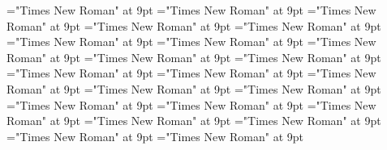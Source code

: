 \documentclass[gps1,twoside]{article}
\begin{document}
\font\variantformentrybackrefssensesensessubentrysubentriesentryafter="Times New Roman" at 9pt
\font\variantentrytypevariantentrytypevariantentrytypesvariantformentrybackrefvariantformentrybackrefssensesensessubentrysubentriesentrybefore="Times New Roman" at 9pt
\font\variantentrytypesvariantformentrybackrefvariantformentrybackrefssensesensessubentrysubentriesentryafter="Times New Roman" at 9pt
\font\reverseabbrvariantentrytypevariantentrytypesvariantformentrybackrefvariantformentrybackrefssensesensessubentrysubentriesentrybefore="Times New Roman" at 9pt
\font\spanreverseabbrvariantentrytypevariantentrytypesvariantformentrybackrefvariantformentrybackrefssensesensessubentrysubentriesentrylastchildafter="Times New Roman" at 9pt
\font\headwordvariantformentrybackrefvariantformentrybackrefssensesensessubentrysubentriesentrybefore="Times New Roman" at 9pt
\font\owningentrysummarydefinitionvariantformentrybackrefvariantformentrybackrefssensesensessubentrysubentriesentrybefore="Times New Roman" at 9pt
\font\spanowningentrysummarydefinitionvariantformentrybackrefvariantformentrybackrefssensesensessubentrysubentriesentrylastchildafter="Times New Roman" at 9pt
\font\scientificnamesensesensessubentrysubentriesentryafter="Times New Roman" at 9pt
\font\semanticdomainsemanticdomainsemanticdomainssensesensessubentrysubentriesentrybefore="Times New Roman" at 9pt
\font\semanticdomainssensesensessubentrysubentriesentrybefore="Times New Roman" at 9pt
\font\semanticdomainssensesensessubentrysubentriesentryafter="Times New Roman" at 9pt
\font\abbreviationsemanticdomainsemanticdomainssensesensessubentrysubentriesentrybefore="Times New Roman" at 9pt
\font\spanabbreviationsemanticdomainsemanticdomainssensesensessubentrysubentriesentrylastchildafter="Times New Roman" at 9pt
\font\namesemanticdomainsemanticdomainssensesensessubentrysubentriesentrybefore="Times New Roman" at 9pt
\font\academicdomainacademicdomainacademicdomainssensesensessubentrysubentriesentrybefore="Times New Roman" at 9pt
\font\academicdomainssensesensessubentrysubentriesentrybefore="Times New Roman" at 9pt
\font\academicdomainssensesensessubentrysubentriesentryafter="Times New Roman" at 9pt
\font\abbreviationacademicdomainacademicdomainssensesensessubentrysubentriesentrybefore="Times New Roman" at 9pt
\font\nameacademicdomainacademicdomainssensesensessubentrysubentriesentrybefore="Times New Roman" at 9pt
\font\spannameacademicdomainacademicdomainssensesensessubentrysubentriesentryfirstchildbefore="Times New Roman" at 9pt
\font\spannameacademicdomainacademicdomainssensesensessubentrysubentriesentrylastchildafter="Times New Roman" at 9pt
\end{document}
